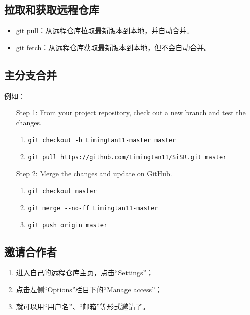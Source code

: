 \subsection{拉取和获取远程仓库}
\begin{itemize}
\item git pull：从远程仓库拉取最新版本到本地，并自动合并。
\item git fetch：从远程仓库获取最新版本到本地，但不会自动合并。
\end{itemize}


\subsection{主分支合并}
例如：
\begin{itemize}
\item[Step 1:] From your project repository, check out a new branch and test the changes.
\begin{enumerate}
\item \verb|git checkout -b Limingtan11-master master|

\item \verb|git pull https://github.com/Limingtan11/SiSR.git master|
\end{enumerate}

\item [Step 2:] Merge the changes and update on GitHub.
\begin{enumerate}
\item  \verb|git checkout master|

\item \verb|git merge --no-ff Limingtan11-master|

\item \verb|git push origin master|
\end{enumerate}
\end{itemize}



\subsection{邀请合作者}
\begin{enumerate}
\item 进入自己的远程仓库主页，点击“Settings”；
\item 点击左侧“Options”栏目下的“Manage access”；
\item 就可以用“用户名”、“邮箱”等形式邀请了。
\end{enumerate}






